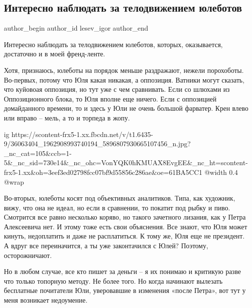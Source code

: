  
 
 
 
 
 
\subsection{Интересно наблюдать за телодвижением юлеботов}
\label{sec:22_06_2018.fb.lesev_igor.1.juleboty}
 
\ifcmt
 author_begin
   author_id lesev_igor
 author_end
\fi

Интересно наблюдать за телодвижением юлеботов, которых, оказывается, достаточно
и в моей френд-ленте.

Хотя, признаюсь, юлеботы на порядок меньше раздражают, нежели порохоботы.
Во-первых, потому что Юля какая никакая, а оппозиция. Ватники могут сказать,
что куйовоая оппозиция, но тут уже с чем сравнивать. Если со шлюхами из
Оппозиционного блока, то Юля вполне еще ничего. Если с оппозицией домайданного
времени, то и здесь у Юли не очень большой фарватер. Крен влево или вправо –
мель, а то и торпеда в жопу.

\ifcmt
  ig https://scontent-frx5-1.xx.fbcdn.net/v/t1.6435-9/36063404_1962908993740194_5896807930665107456_n.jpg?_nc_cat=105&ccb=1-5&_nc_sid=730e14&_nc_ohc=VonYQK0hKMUAX8EvgEE&_nc_ht=scontent-frx5-1.xx&oh=3eef3ed02798fcc07bf9d55856c286ae&oe=61BA5CC1
  @width 0.4
  @wrap 
\fi

Во-вторых, юлеботы косят под объективных аналитиков. Типа, как художник, вижу,
что она не идеал, но если в сравнении, то покатит под рыбку и пиво. Смотрится
все равно несколько коряво, но такого зачетного лизания, как у Петра
Алексеевича нет. И этому тоже есть свои объяснения. Все знают, что Юля может
кинуть, недоплатить и даже не расплатиться. К тому же, Юля еще не президент. А
вдруг все переиначится, а ты уже законтачился с Юлей? Поэтому, осторожничают.

Но в любом случае, все кто пишет за деньги – я их понимаю и критикую разве что
только топорную методу. Не более того. Но когда начинают вылезать бесплатные
почитатели Юли, уверовавшие в изменения «после Петра», вот тут у меня возникает
недоумение.

